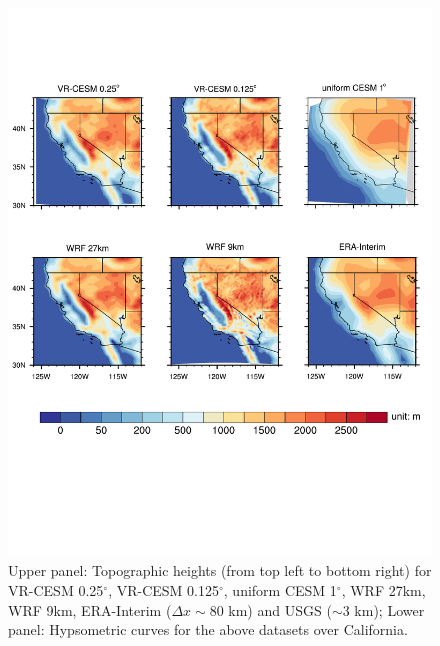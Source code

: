 \documentclass[ms,draft]{agutex}   %
\begin{document}
\begin{figure}
\begin{center}
\includegraphics[width=6in]{topo.pdf}
\end{center}
\caption{Upper panel: Topographic heights (from top left to bottom right) for VR-CESM 0.25$^\circ$, VR-CESM 0.125$^\circ$, uniform CESM 1$^\circ$, WRF 27km, WRF 9km, ERA-Interim ($\Delta x \sim$80 km) and USGS ($\sim$3 km); Lower panel: Hypsometric curves for the above datasets over California.} \label{fig:Figure 2} 
\end{figure}
\end{document}
